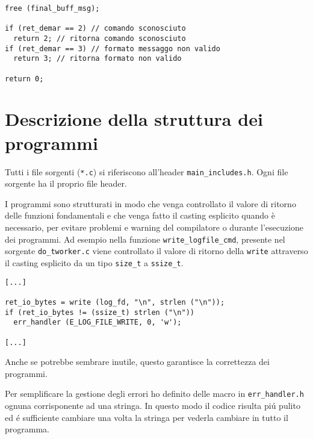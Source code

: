 \documentclass[12pt a4paper oneside]{article}
\begin{document}
{\begin{verbatim}
free (final_buff_msg);

if (ret_demar == 2) // comando sconosciuto
  return 2; // ritorna comando sconosciuto
if (ret_demar == 3) // formato messaggo non valido
  return 3; // ritorna formato non valido

return 0;

			\end{verbatim}
		\newpage
	\part{Descrizione della struttura dei programmi}
		\par
		Tutti i file sorgenti (\texttt{*.c}) si riferiscono all'header \texttt{main\_includes.h}. Ogni file sorgente ha il proprio file header.
		\par
		I programmi sono strutturati in modo che venga controllato il valore di ritorno delle funzioni fondamentali e che venga fatto il casting esplicito quando è necessario, per evitare problemi e warning del compilatore o durante l'esecuzione dei programmi. Ad esempio nella funzione \texttt{write\_logfile\_cmd}, presente nel sorgente \texttt{do\_tworker.c} viene controllato il valore di ritorno della \texttt{write} attraverso il casting esplicito da un tipo \texttt{size\_t} a \texttt{ssize\_t}.
		\begin{verbatim}
[...]

ret_io_bytes = write (log_fd, "\n", strlen ("\n"));
if (ret_io_bytes != (ssize_t) strlen ("\n"))
  err_handler (E_LOG_FILE_WRITE, 0, 'w');

[...]
		\end{verbatim}
		Anche se potrebbe sembrare inutile, questo garantisce la correttezza dei programmi.
		\par
		Per semplificare la gestione degli errori ho definito delle macro in \texttt{err\_handler.h} ognuna corrisponente ad una stringa. In questo modo il codice risulta pi\'u pulito ed \'e sufficiente cambiare una volta la stringa per vederla cambiare in tutto il programma.
		\newpage
}
\end{document}
